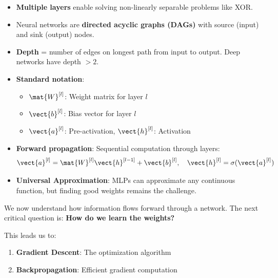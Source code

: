 \begin{itemize}
    \item \textbf{Multiple layers} enable solving non-linearly separable problems like XOR.
    
    \item Neural networks are \textbf{directed acyclic graphs (DAGs)} with source (input) and sink (output) nodes.
    
    \item \textbf{Depth} = number of edges on longest path from input to output. Deep networks have depth $> 2$.
    
    \item \textbf{Standard notation}:
    \begin{itemize}
        \item $\mat{W}^{[l]}$: Weight matrix for layer $l$
        \item $\vect{b}^{[l]}$: Bias vector for layer $l$
        \item $\vect{a}^{[l]}$: Pre-activation, $\vect{h}^{[l]}$: Activation
    \end{itemize}
    
    \item \textbf{Forward propagation}: Sequential computation through layers:
    \[
    \vect{a}^{[l]} = \mat{W}^{[l]} \vect{h}^{[l-1]} + \vect{b}^{[l]}, \quad \vect{h}^{[l]} = \sigma(\vect{a}^{[l]})
    \]
    
    \item \textbf{Universal Approximation}: MLPs can approximate any continuous function, but finding good weights remains the challenge.
\end{itemize}

\begin{bluebox}
We now understand how information flows forward through a network. The next critical question is: \textbf{How do we learn the weights?}

This leads us to:
\begin{enumerate}
    \item \textbf{Gradient Descent}: The optimization algorithm
    \item \textbf{Backpropagation}: Efficient gradient computation
\end{enumerate}
\end{bluebox}
